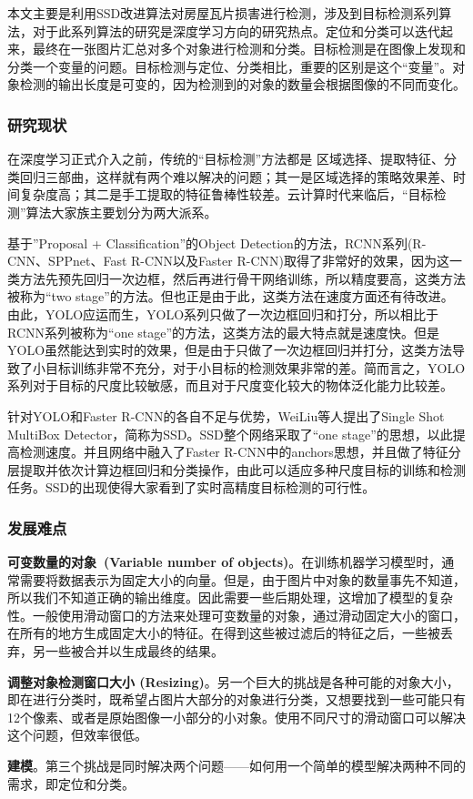 本文主要是利用SSD改进算法对房屋瓦片损害进行检测，涉及到目标检测系列算法，对于此系列算法的研究是深度学习方向的研究热点。定位和分类可以迭代起来，最终在一张图片汇总对多个对象进行检测和分类。目标检测是在图像上发现和分类一个变量的问题。目标检测与定位、分类相比，重要的区别是这个“变量”。对象检测的输出长度是可变的，因为检测到的对象的数量会根据图像的不同而变化。

\subsubsection{研究现状}
在深度学习正式介入之前，传统的“目标检测”方法都是 区域选择、提取特征、分类回归三部曲，这样就有两个难以解决的问题；其一是区域选择的策略效果差、时间复杂度高；其二是手工提取的特征鲁棒性较差。云计算时代来临后，“目标检测”算法大家族主要划分为两大派系。

基于”Proposal + Classification”的Object Detection的方法，RCNN系列(R-CNN\cite{rcnn}、SPPnet\cite{sppnet}、Fast R-CNN\cite{fastrcnn}以及Faster R-CNN\cite{fasterrcnn})取得了非常好的效果，因为这一类方法先预先回归一次边框，然后再进行骨干网络训练，所以精度要高，这类方法被称为“two stage”的方法。但也正是由于此，这类方法在速度方面还有待改进。由此，YOLO\cite{yolo}应运而生，YOLO系列只做了一次边框回归和打分，所以相比于RCNN系列被称为“one stage”的方法，这类方法的最大特点就是速度快。但是YOLO虽然能达到实时的效果，但是由于只做了一次边框回归并打分，这类方法导致了小目标训练非常不充分，对于小目标的检测效果非常的差。简而言之，YOLO系列对于目标的尺度比较敏感，而且对于尺度变化较大的物体泛化能力比较差。

针对YOLO和Faster R-CNN的各自不足与优势，WeiLiu等人提出了Single Shot MultiBox Detector，简称为SSD\cite{ssd}。SSD整个网络采取了“one stage”的思想，以此提高检测速度。并且网络中融入了Faster R-CNN\cite{fasterrcnn}中的anchors思想，并且做了特征分层提取并依次计算边框回归和分类操作，由此可以适应多种尺度目标的训练和检测任务。SSD的出现使得大家看到了实时高精度目标检测的可行性。

\subsubsection{发展难点}
\textbf{可变数量的对象 (Variable number of objects)}。在训练机器学习模型时，通常需要将数据表示为固定大小的向量。但是，由于图片中对象的数量事先不知道，所以我们不知道正确的输出维度。因此需要一些后期处理，这增加了模型的复杂性。一般使用滑动窗口的方法来处理可变数量的对象，通过滑动固定大小的窗口，在所有的地方生成固定大小的特征。在得到这些被过滤后的特征之后，一些被丢弃，另一些被合并以生成最终的结果。

\textbf{调整对象检测窗口大小 (Resizing)}。另一个巨大的挑战是各种可能的对象大小，即在进行分类时，既希望占图片大部分的对象进行分类，又想要找到一些可能只有12个像素、或者是原始图像一小部分的小对象。使用不同尺寸的滑动窗口可以解决这个问题，但效率很低。

\textbf{建模}。第三个挑战是同时解决两个问题——如何用一个简单的模型解决两种不同的需求，即定位和分类。
